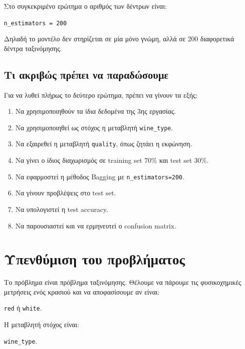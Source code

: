 \documentclass[12pt,a4paper]{article}
\newcommand{\code}[1]{\texttt{\textenglish{#1}}}
\begin{document}
Στο συγκεκριμένο ερώτημα ο αριθμός των δέντρων είναι:

\begin{center}
\code{n\_estimators = 200}
\end{center}

Δηλαδή το μοντέλο δεν στηρίζεται σε μία μόνο γνώμη, αλλά σε 200 διαφορετικά
δέντρα ταξινόμησης.

\subsection{Τι ακριβώς πρέπει να παραδώσουμε}

Για να λυθεί πλήρως το δεύτερο ερώτημα, πρέπει να γίνουν τα εξής:

\begin{enumerate}[label=\arabic*.]
    \item Να χρησιμοποιηθούν τα ίδια δεδομένα της 3ης εργασίας.
    \item Να χρησιμοποιηθεί ως στόχος η μεταβλητή \code{wine\_type}.
    \item Να εξαιρεθεί η μεταβλητή \code{quality}, όπως ζητάει η εκφώνηση.
    \item Να γίνει ο ίδιος διαχωρισμός σε training set 70\% και test set 30\%.
    \item Να εφαρμοστεί η μέθοδος Bagging με \code{n\_estimators=200}.
    \item Να γίνουν προβλέψεις στο test set.
    \item Να υπολογιστεί η test accuracy.
    \item Να παρουσιαστεί και να ερμηνευτεί ο confusion matrix.
\end{enumerate}

\section{Υπενθύμιση του προβλήματος}

Το πρόβλημα είναι πρόβλημα ταξινόμησης. Θέλουμε να πάρουμε τις φυσικοχημικές
μετρήσεις ενός κρασιού και να αποφασίσουμε αν είναι:

\begin{center}
\code{red} ή \code{white}.
\end{center}

Η μεταβλητή στόχος είναι:

\begin{center}
\code{wine\_type}.
\end{center}
\end{document}
